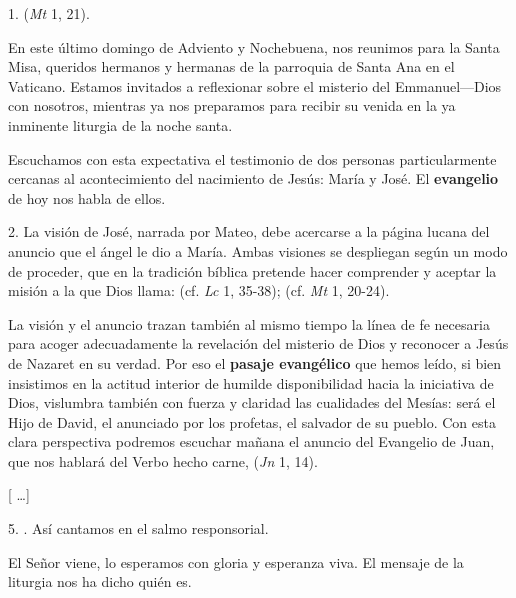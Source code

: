 
				\begin{body}
					1.  (\emph{Mt} 1, 21).
					
					En este último domingo de Adviento y Nochebuena, nos reunimos para la Santa Misa, queridos hermanos y hermanas de la parroquia de Santa Ana en el Vaticano. Estamos invitados a reflexionar sobre el misterio del Emmanuel---Dios con nosotros, mientras ya nos preparamos para recibir su venida en la ya inminente liturgia de la noche santa.
					
					Escuchamos con esta expectativa el testimonio de dos personas particularmente cercanas al acontecimiento del nacimiento de Jesús: María y José. El \textbf{evangelio} de hoy nos habla de ellos.
					
					2. La visión de José, narrada por Mateo, debe acercarse a la página lucana del anuncio que el ángel le dio a María. Ambas visiones se despliegan según un modo de proceder, que en la tradición bíblica pretende hacer comprender y aceptar la misión a la que Dios llama:  (cf. \emph{Lc} 1, 35-38);  (cf. \emph{Mt} 1, 20-24).
					
					La visión y el anuncio trazan también al mismo tiempo la línea de fe necesaria para acoger adecuadamente la revelación del misterio de Dios y reconocer a Jesús de Nazaret en su verdad. Por eso el \textbf{pasaje evangélico} que hemos leído, si bien insistimos en la actitud interior de humilde disponibilidad hacia la iniciativa de Dios, vislumbra también con fuerza y ​​claridad las cualidades del Mesías: será el Hijo de David, el anunciado por los profetas, el salvador de su pueblo. Con esta clara perspectiva podremos escuchar mañana el anuncio del Evangelio de Juan, que nos hablará del Verbo hecho carne,  (\emph{Jn} 1, 14).
					
					{[} \ldots{}{]}
					
					5. . Así cantamos en el salmo responsorial.
					
					El Señor viene, lo esperamos con gloria y esperanza viva. El mensaje de la liturgia nos ha dicho quién es.
					

\end{body}
